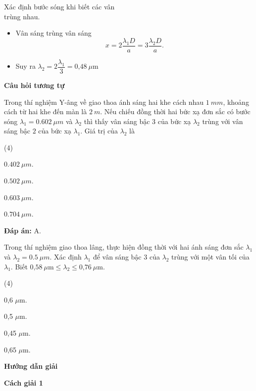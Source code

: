 \begin{dang}{Xác định bước sóng khi biết các vân\\ trùng nhau.}
{		\begin{itemize}
			\item Vân sáng trùng vân sáng
			\begin{equation*}
				x=2\dfrac{\lambda_1 D}{a}=3\dfrac{\lambda_2 D}{a}.
			\end{equation*}
			\item Suy ra $\lambda_2=2\dfrac{\lambda_1}{3} = \text{0,48}\ \mu \text{m}$
		\end{itemize}
		
		\begin{center}
			\textbf{Câu hỏi tương tự}
		\end{center}
		Trong thí nghiệm Y-âng về giao thoa ánh sáng hai khe cách nhau $ \SI{1}{mm} $, khoảng cách từ hai khe đến màn là $ \SI{2}{m} $. Nếu chiếu đồng thời hai bức xạ đơn sắc có bước sóng $ \lambda_{1} = \SI{0,602}{\mu m} $  và $ \lambda_{2} $ thì thấy vân sáng bậc 3 của bức xạ $ \lambda_{2} $ trùng với vân sáng bậc $ 2 $ của bức xạ $ \lambda_{1} $. Giá trị của $ \lambda_{2} $ là
		\begin{mcq}(4)
			\item $ \SI{0,402}{\mu m} $.
			\item $ \SI{0,502}{\mu m} $.
			\item $ \SI{0,603}{\mu m} $.
			\item $ \SI{0,704}{\mu m} $.
		\end{mcq}
		\textbf{Đáp án:} A.
	}
	
	{Trong thí nghiệm giao thoa lâng, thực hiện đồng thời với hai ánh sáng đơn sắc  $\lambda_1$ và $\lambda_2 = \SI{0,5}{\mu m} $. Xác định $\lambda_1$ để vân sáng bậc 3 của $\lambda_2$ trùng với một vân tối của $\lambda_1$. Biết $\text{0,58}\ \mu \text{m} \leq \lambda_2 \leq \text{0,76}\ \mu \text{m}$.
		\begin{mcq}(4)
			\item  0,6 $\mu$m.			
			\item  0,5 $\mu$m.			
			\item  0,45 $\mu$m.			
			\item  0,65 $\mu$m.
		\end{mcq}
	}
	{\begin{center}
			\textbf{Hướng dẫn giải}
		\end{center}
		\textbf{Cách giải 1}
		
}
\end{dang}
